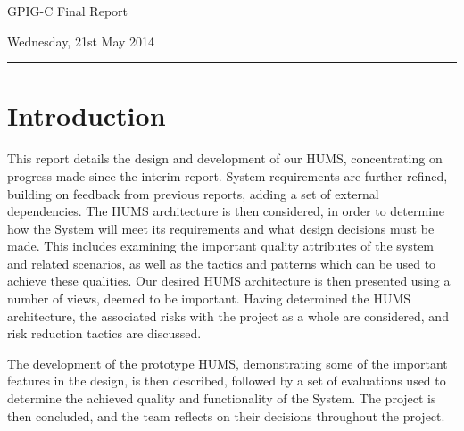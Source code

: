 \documentclass[10pt,a4paper]{article}
\begin{document}
\begin{center}
{\vspace*{-0.5cm}
\Huge GPIG-C Final Report}
\vspace*{0.2cm}

\vspace*{0.1cm}

Wednesday, 21st May 2014
\end{center}
\vspace*{0.4cm}
\hrule
\vspace*{0.4cm}

\section{Introduction}
\label{sec:intro}
This report details the design and development of our HUMS, concentrating on progress made since the interim report. System requirements are further refined, building on feedback from previous reports, adding a set of external dependencies. The HUMS architecture is then considered, in order to determine how the System will meet its requirements and what design decisions must be made. This includes examining the important quality attributes of the system and related scenarios, as well as the tactics and patterns which can be used to achieve these qualities. Our desired HUMS architecture is then presented using a number of views, deemed to be important. Having determined the HUMS architecture, the associated risks with the project as a whole are considered, and risk reduction tactics are discussed.

The development of the prototype HUMS, demonstrating some of the important features in the design, is then described, followed by a set of evaluations used to determine the achieved quality and functionality of the System. The project is then concluded, and the team reflects on their decisions throughout the project.

\end{document}
